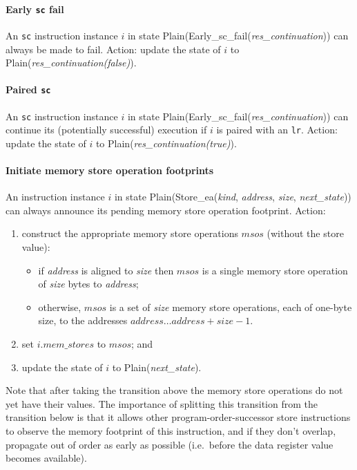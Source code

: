\paragraph{Early {\tt sc} fail}\label{omm:early_sc_fail}
An {\tt sc} instruction instance $i$ in state {\sc Plain}({\sc Early\_sc\_fail}({\it res\_continuation})) can always be made to fail.
Action: update the state of $i$ to {\sc Plain}({\it res\_continuation(false)}).


\paragraph{Paired {\tt sc}}\label{omm:paired_sc}
An {\tt sc} instruction instance $i$ in state {\sc Plain}({\sc Early\_sc\_fail}({\it res\_continuation})) can continue its (potentially successful) execution if $i$ is paired with an {\tt lr}.
Action: update the state of $i$ to {\sc Plain}({\it res\_continuation(true)}).


\paragraph{Initiate memory store operation footprints}\label{omm:initiate_store_footprint}
An instruction instance $i$ in state {\sc Plain}({\sc Store\_ea}({\it kind}, {\it address}, {\it size}, {\it next\_state})) can always announce its pending memory store operation footprint.
Action:
\begin{enumerate}
\item construct the appropriate memory store operations $msos$ (without the store value):
  \begin{itemize}
  \item if {\it address} is aligned to {\it size} then $msos$ is a single memory store operation of {\it size} bytes to {\it address};
  \item otherwise, $msos$ is a set of {\it size} memory store operations, each of one-byte size, to the addresses $\textit{address}\ldots\textit{address}+\textit{size}-1$.
  \end{itemize}
\item set $i.\textit{mem\_stores}$ to $msos$; and
\item update the state of $i$ to {\sc Plain}({\it next\_state}).
\end{enumerate}

\begin{commentary}
Note that after taking the transition above the memory store operations do not yet have their values.
The importance of splitting this transition from the transition below is that it allows other program-order-successor store instructions to observe the memory footprint of this instruction, and if they don't overlap, propagate out of order as early as possible (i.e.~before the data register value becomes available).
\end{commentary}


